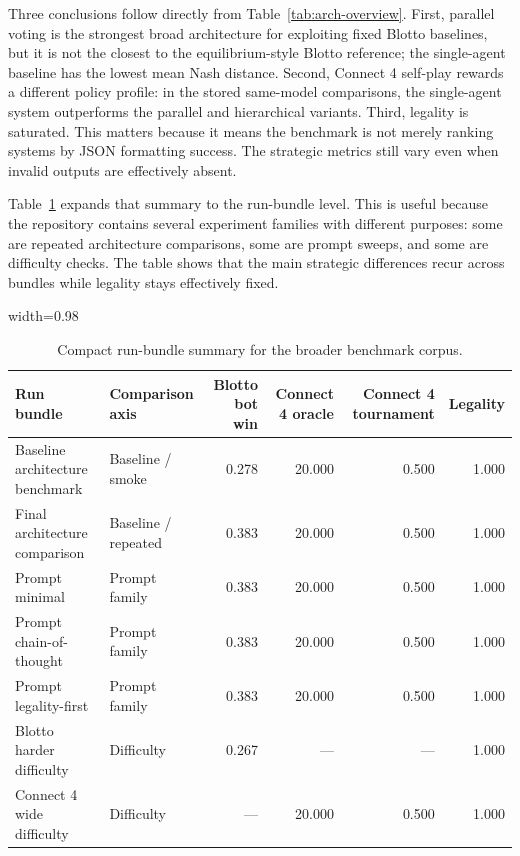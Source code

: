 \documentclass[11pt]{article}
\begin{document}
Three conclusions follow directly from Table~\ref{tab:arch-overview}. First, parallel voting is the strongest broad architecture for exploiting fixed Blotto baselines, but it is not the closest to the equilibrium-style Blotto reference; the single-agent baseline has the lowest mean Nash distance. Second, Connect 4 self-play rewards a different policy profile: in the stored same-model comparisons, the single-agent system outperforms the parallel and hierarchical variants. Third, legality is saturated. This matters because it means the benchmark is not merely ranking systems by JSON formatting success. The strategic metrics still vary even when invalid outputs are effectively absent.

Table~\ref{tab:run-bundle-overview} expands that summary to the run-bundle level. This is useful because the repository contains several experiment families with different purposes: some are repeated architecture comparisons, some are prompt sweeps, and some are difficulty checks. The table shows that the main strategic differences recur across bundles while legality stays effectively fixed.

\begin{table}[H]
\centering
\caption{Compact run-bundle summary for the broader benchmark corpus.}
\label{tab:run-bundle-overview}
\footnotesize
\begin{adjustbox}{width=0.98\textwidth}
\begin{tabular}{@{}llrrrr@{}}
\toprule
Run bundle & Comparison axis & Blotto bot win & Connect 4 oracle & Connect 4 tournament & Legality \\
\midrule
Baseline architecture benchmark & Baseline / smoke & 0.278 & 20.000 & 0.500 & 1.000 \\
Final architecture comparison & Baseline / repeated & 0.383 & 20.000 & 0.500 & 1.000 \\
Prompt minimal & Prompt family & 0.383 & 20.000 & 0.500 & 1.000 \\
Prompt chain-of-thought & Prompt family & 0.383 & 20.000 & 0.500 & 1.000 \\
Prompt legality-first & Prompt family & 0.383 & 20.000 & 0.500 & 1.000 \\
Blotto harder difficulty & Difficulty & 0.267 & --- & --- & 1.000 \\
Connect 4 wide difficulty & Difficulty & --- & 20.000 & 0.500 & 1.000 \\
\bottomrule
\end{tabular}
\end{adjustbox}
\normalsize
\end{table}
\end{document}
